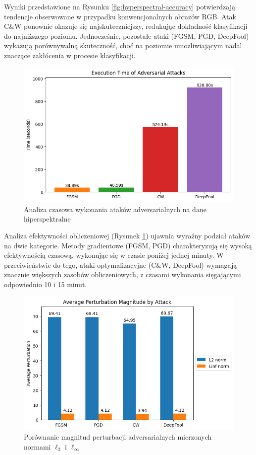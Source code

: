 \documentclass[12pt]{article}
\begin{document}
Wyniki przedstawione na Rysunku \ref{fig:hyperspectral-accuracy} potwierdzają tendencje obserwowane w przypadku konwencjonalnych obrazów RGB. Atak C\&W ponownie okazuje się najskuteczniejszy, redukując dokładność klasyfikacji do najniższego poziomu. Jednocześnie, pozostałe ataki (FGSM, PGD, DeepFool) wykazują porównywalną skuteczność, choć na poziomie umożliwiającym nadal znaczące zakłócenia w procesie klasyfikacji.

\begin{figure}[H]
    \centering
    \includegraphics[width=1\textwidth]{hybridsn_time.png} 
    \caption{Analiza czasowa wykonania ataków adversarialnych na dane hiperspektralne}
    \label{fig:hyperspectral-time}
\end{figure}

Analiza efektywności obliczeniowej (Rysunek \ref{fig:hyperspectral-time}) ujawnia wyraźny podział ataków na dwie kategorie. Metody gradientowe (FGSM, PGD) charakteryzują się wysoką efektywnością czasową, wykonując się w czasie poniżej jednej minuty. W przeciwieństwie do tego, ataki optymalizacyjne (C\&W, DeepFool) wymagają znacznie większych zasobów obliczeniowych, z czasami wykonania sięgającymi odpowiednio 10 i 15 minut.

\begin{figure}[H]
    \centering
    \includegraphics[width=1\textwidth]{perturbations.png} 
    \caption{Porównanie magnitud perturbacji adversarialnych mierzonych normami $\ell_2$ i $\ell_\infty$}
\end{figure}
\end{document}
